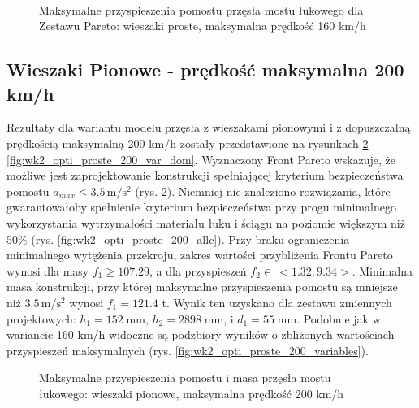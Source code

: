 \begin{figure}[hbt!]
	\centering
	\\
	\captionsetup{justification=centering}
	\caption{Maksymalne przyspieszenia pomostu przęsła mostu łukowego dla Zestawu Pareto: wieszaki proste, maksymalna prędkość 160 km/h}
	\label{fig:wk2_opti_proste_160_var_dom}
\end{figure}





\pagebreak[4]
\subsection{Wieszaki Pionowe - prędkość maksymalna 200 km/h}

Rezultaty dla wariantu modelu przęsła z wieszakami pionowymi i z dopuszczalną prędkością maksymalną 200 km/h zostały przedstawione na rysunkach \ref{fig:wk2_opti_proste_200_all} - \ref{fig:wk2_opti_proste_200_var_dom}. Wyznaczony Front Pareto wskazuje, że możliwe jest zaprojektowanie konstrukcji spełniającej kryterium bezpieczeństwa pomostu $a_{max}\le 3.5\,\mathrm{m/s^2}$ (rys. \ref{fig:wk2_opti_proste_200_all}). Niemniej nie znaleziono rozwiązania, które gwarantowałoby spełnienie kryterium bezpieczeństwa przy progu minimalnego wykorzystania wytrzymałości materiału łuku i ściągu na poziomie większym niż 50\% (rys. \ref{fig:wk2_opti_proste_200_allc}). Przy braku ograniczenia minimalnego wytężenia przekroju, zakres wartości przybliżenia Frontu Pareto wynosi dla masy $f_1 \ge 107.29$, a dla przyspieszeń $f_2 \in\,<1.32,9.34>$. Minimalna masa konstrukcji, przy której maksymalne przyspieszenia pomostu są mniejsze niż $3.5\,\mathrm{m/s^2}$ wynosi $f_1 = 121.4$ t. Wynik ten uzyskano dla zestawu zmiennych projektowych: $h_1 = 152\;\mathrm{mm}$, $h_2 = 2898\;\mathrm{mm}$, i $d_1 = 55\;\mathrm{mm}$. Podobnie jak w wariancie 160 km/h widoczne są podzbiory wyników o zbliżonych wartościach przyspieszeń maksymalnych (rys. \ref{fig:wk2_opti_proste_200_variables}).

\begin{figure}[hbt!]
	\centering
	\captionsetup{justification=centering}
	\caption{Maksymalne przyspieszenia pomostu i masa przęsła mostu łukowego: wieszaki pionowe, maksymalna prędkość 200 km/h}
	\label{fig:wk2_opti_proste_200_all}
\end{figure}

